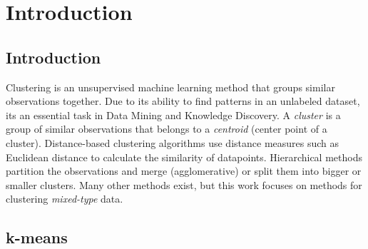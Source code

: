 \chapter{Introduction}


\section{Introduction}

Clustering is an unsupervised machine learning method that groups similar observations together. Due to its ability to find patterns in an unlabeled dataset, its an essential task in Data Mining and Knowledge Discovery. A \textit{cluster} is a group of similar observations that belongs to a \textit{centroid} (center point of a cluster). Distance-based clustering algorithms use distance measures such as Euclidean distance to calculate the similarity of datapoints. Hierarchical methods partition the observations and merge (agglomerative) or split them into bigger or smaller clusters. Many other methods exist, but this work focuses on methods for clustering \textit{mixed-type} data. \cite{mixed_type_survey_2019}

\section{k-means}

